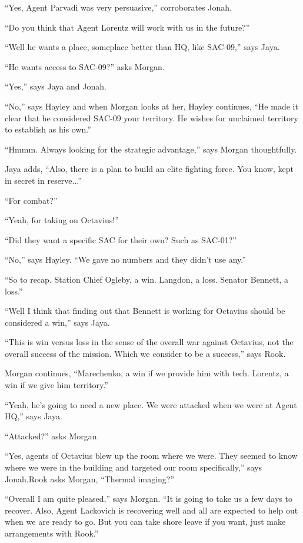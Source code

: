 ``Yes, Agent Parvadi was very persuasive,'' corroborates Jonah. 

``Do you think that Agent Lorentz will work with us in the future?''

``Well he wants a place, someplace better than HQ, like SAC-09,'' says Jaya.

``He wants access to SAC-09?'' asks Morgan.

``Yes,'' says Jaya and Jonah.

``No,'' says Hayley and when Morgan looks at her, Hayley continues, ``He made it clear that he considered SAC-09 your territory.  He wishes for unclaimed territory to establish as his own.''

``Hmmm.  Always looking for the strategic advantage,'' says Morgan thoughtfully.

Jaya adds, ``Also, there is a plan to build an elite fighting force.  You know, kept in secret in reserve...''

``For combat?''

``Yeah, for taking on Octavius!''

``Did they want a specific SAC for their own?  Such as SAC-01?''

``No,'' says Hayley.  ``We gave no numbers and they didn't use any.''

``So to recap.  Station Chief Ogleby, a win.  Langdon, a loss.  Senator Bennett, a loss.''

``Well I think that finding out that Bennett is working for Octavius should be considered a win,'' says Jaya.

``This is win versus loss in the sense of the overall war against Octavius, not the overall success of the mission.  Which we consider to be a success,'' says Rook.

Morgan continues, ``Marechenko, a win if we provide him with tech.  Lorentz, a win if we give him territory.''

``Yeah, he's going to need a new place.  We were attacked when we were at Agent HQ,'' says Jaya.

``Attacked?'' asks Morgan.

``Yes, agents of Octavius blew up the room where we were. They seemed to know where we were in the building and targeted our room specifically,'' says Jonah.Rook asks Morgan, ``Thermal imaging?''

``Overall I am quite pleased,'' says Morgan.  ``It is going to take us a few days to recover.  Also, Agent Lackovich is recovering well and all are expected to help out when we are ready to go.  But you can take shore leave if you want, just make arrangements with Rook.''


